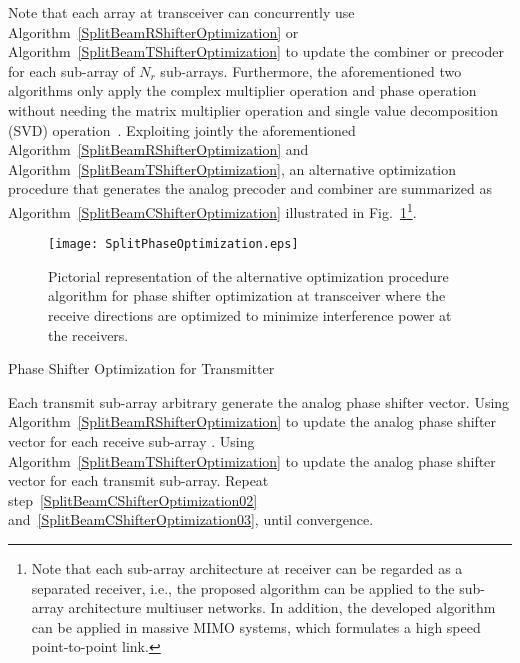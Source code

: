 \documentclass[11pt,draftcls,onecolumn]{IEEEtran}
\begin{document}
Note that each array at transceiver can concurrently use Algorithm~\ref{SplitBeamRShifterOptimization} or Algorithm~\ref{SplitBeamTShifterOptimization} to update the combiner or precoder for each sub-array of $N_{r}$ sub-arrays. Furthermore, the aforementioned two algorithms only apply the complex multiplier operation and phase operation without needing the matrix multiplier operation and single value decomposition (SVD) operation~\cite{TWCXiao2015,TWCAyach2014,JSTSPAlk2014,TWCAlk2015,TSPLee2015}. Exploiting jointly the aforementioned Algorithm~\ref{SplitBeamRShifterOptimization} and Algorithm~\ref{SplitBeamTShifterOptimization}, an alternative optimization procedure that generates the analog precoder and combiner are summarized as Algorithm~\ref{SplitBeamCShifterOptimization} illustrated in Fig.~\ref{PhaseShifterOptimization}\footnote{Note that each sub-array architecture at receiver can be regarded as a separated receiver, i.e., the proposed algorithm can be applied to the sub-array architecture multiuser networks. In addition, the developed algorithm can be applied in massive MIMO systems, which formulates a high speed point-to-point link. }.
\begin{figure}[h]%
\centering
{}
\onelinecaptionstrue
\texttt{[image: SplitPhaseOptimization.eps]}\\
\caption{Pictorial representation of the alternative optimization procedure algorithm for phase shifter optimization at transceiver where the receive directions are optimized to minimize interference power at the receivers.}
\label{PhaseShifterOptimization}
\end{figure}
\begin{algorithm}
\caption{Phase Shifter Optimization for Transmitter}\label{SplitBeamCShifterOptimization}
\begin{algorithmic}[1]
\STATE Each transmit sub-array arbitrary generate the analog phase shifter vector.\label{SplitBeamCShifterOptimization01}
\STATE Using Algorithm~\ref{SplitBeamRShifterOptimization} to update the analog phase shifter vector for each receive sub-array \label{SplitBeamCShifterOptimization02}.
\STATE Using Algorithm~\ref{SplitBeamTShifterOptimization} to update the analog phase shifter vector for each transmit sub-array.\label{SplitBeamCShifterOptimization03}
\STATE Repeat step~\ref{SplitBeamCShifterOptimization02} and~\ref{SplitBeamCShifterOptimization03}, until convergence.\label{SplitBeamCShifterOptimization04}
\end{algorithmic}
\end{algorithm}
\end{document}

